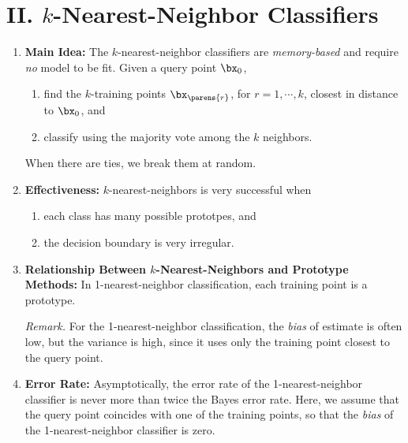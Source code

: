 \documentclass[12pt]{article}
\begin{document}
\section*{II. $k$-Nearest-Neighbor Classifiers}

\begin{enumerate}[label=\textbf{\arabic*.}]

	\item \textbf{Main Idea:} The $k$-nearest-neighbor classifiers are \emph{memory-based} and require \emph{no} model to be fit. Given a query point $\bx_0$, 
	\begin{enumerate}
		\item find the $k$-training points $\bx_{\parens{r}}$, for $r = 1, \cdots, k$, closest in distance to $\bx_0$, and 
		\item classify using the majority vote among the $k$ neighbors. 
	\end{enumerate}
	When there are ties, we break them at random. 
	
	\item \textbf{Effectiveness:} $k$-nearest-neighbors is very successful when 
	\begin{enumerate}
		\item each class has many possible prototpes, and 
		\item the decision boundary is very irregular. 
	\end{enumerate}
	
	\item \textbf{Relationship Between $k$-Nearest-Neighbors and Prototype Methods:} In 1-nearest-neighbor classification, each training point is a prototype. 
	
	\textit{Remark.} For the 1-nearest-neighbor classification, the \emph{bias} of estimate is often low, but the variance is high, since it uses only the training point closest to the query point. 
	
	\item \textbf{Error Rate:} Asymptotically, the error rate of the 1-nearest-neighbor classifier is never more than twice the Bayes error rate. Here, we assume that the query point coincides with one of the training points, so that the \emph{bias} of the 1-nearest-neighbor classifier is zero. 
	

\end{enumerate}
\end{document}
